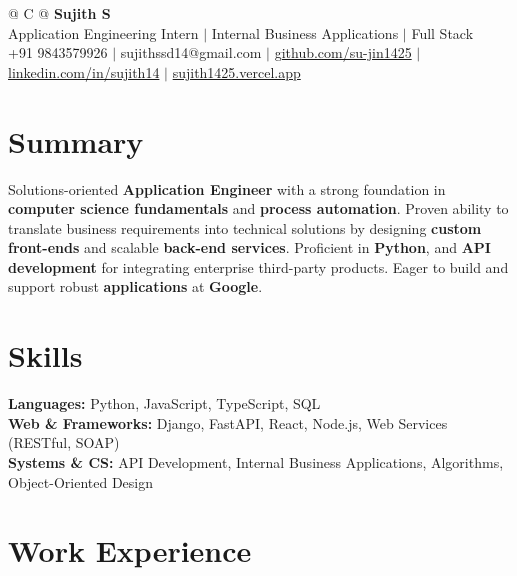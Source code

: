 \documentclass[a4paper,10pt]{article}
\newcommand{\ulink}[2]{\href{#1}{#2}}
\begin{document}
\pagestyle{empty}

\begin{tabularx}{\linewidth}{@{} C @{}}
{\color[HTML]{000000}\fontsize{30}{35}\selectfont\bfseries Sujith S} \\[5pt]
{\fontsize{10.5}{12.5}\selectfont\color[HTML]{3A3A3A}
Application Engineering Intern $|$ Internal Business Applications $|$ Full Stack} \\[6pt]
{\fontsize{9.5}{11.5}\selectfont\textcolor[HTML]{3A3A3A}{+91 9843579926 $|$ sujithssd14@gmail.com $|$ \ulink{https://github.com/su-jin1425}{github.com/su-jin1425} $|$ \ulink{https://linkedin.com/in/sujith14}{linkedin.com/in/sujith14} $|$ \ulink{https://sujith1425.vercel.app}{sujith1425.vercel.app}}}
\end{tabularx}

\section{Summary}
\vspace{2pt}

{\color[HTML]{0A0A0A}\fontsize{11}{14}\selectfont
Solutions-oriented \textbf{Application Engineer} with a strong foundation in \textbf{computer science fundamentals} and \textbf{process automation}. Proven ability to translate business requirements into technical solutions by designing \textbf{custom front-ends} and scalable \textbf{back-end services}. Proficient in \textbf{Python}, and \textbf{API development} for integrating enterprise third-party products. Eager to build and support robust \textbf{applications} at \textbf{Google}.}

\section{Skills}
\vspace{2pt}

{\color[HTML]{0A0A0A}\fontsize{11}{14}\selectfont
\textbf{Languages:} Python, JavaScript, TypeScript, SQL \\[2pt]
\textbf{Web \& Frameworks:} Django, FastAPI, React, Node.js, Web Services (RESTful, SOAP) \\[2pt]
\textbf{Systems \& CS:} API Development, Internal Business Applications, Algorithms, Object-Oriented Design}

\section{Work Experience}
\vspace{2pt}
\end{document}
